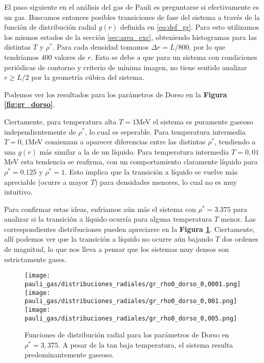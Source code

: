 El paso siguiente en el análisis del gas de Pauli es preguntarse si efectivamente es un gas.
Buscamos entonces posibles transiciones de fase del sistema a través de la función de distribución radial $g(r)$ definida en \eqref{eq:def_gr}. 
Para esto utilizamos los mismos estados de la sección \ref{sec:area_exc}, obteniendo histogramas para las distintas $T$ y $\rho^*$.
Para cada densidad tomamos $\Delta r = L/800$, por lo que tendríamos $400$ valores de $r$.
Esto se debe a que para un sistema con condiciones periódicas de contorno y criterio de mínima imagen, no tiene sentido analizar $r\geq L/2$ por la geometría cúbica del sistema.

Podemos ver los resultados para los parámetros de Dorso en la \textbf{Figura \ref{fig:gr_dorso}}.


Ciertamente, para temperatura alta $T=1$MeV el sistema es puramente gaseoso independientemente de $\rho^*$, lo cual es esperable.
Para temperatura intermedia $T=0,1$MeV comienzan a aparecer diferencias entre las distintas $\rho^*$, tendiendo a una $g(r)$ más similar a la de un líquido.
Para temperatura intermedia $T=0,01$MeV esta tendencia se reafirma, con un comportamiento claramente líquido para $\rho^*=0.125$ y $\rho^*=1$.
Esto implica que la transición a líquido se vuelve más apreciable (ocurre a mayor $T$) para densidades menores, lo cual no es muy intuitivo.

Para confirmar estas ideas, enfriamos aún más el sistema con $\rho^*=3.375$ para analizar si la transición a líquido ocurría para alguna temperatura $T$ menor.
Las correspondientes distribuciones pueden apreciarse en la \textbf{Figura \ref{fig:gr_dorso_frias}}.
Ciertamente, allí podemos ver que la transición a líquido no ocurre aún bajando $T$ dos ordenes de magnitud, lo que nos lleva a pensar que los sistemas muy densos son estrictamente gases.

\begin{figure}[H]
	\centering
	\texttt{[image: pauli\_gas/distribuciones\_radiales/gr\_rho0\_dorso\_0,0001.png]}
	\texttt{[image: pauli\_gas/distribuciones\_radiales/gr\_rho0\_dorso\_0,001.png]}
	\texttt{[image: pauli\_gas/distribuciones\_radiales/gr\_rho0\_dorso\_0,005.png]}
	\caption{Funciones de distribución radial para los parámetros de Dorso en $\rho^*=3,375$.
	A pesar de la tan baja temperatura, el sistema resulta predominantemente gaseoso.}
	\label{fig:gr_dorso_frias}
\end{figure}

